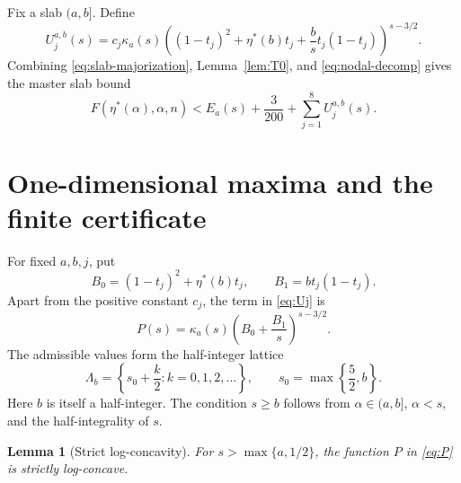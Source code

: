 \documentclass[11pt]{amsart}
\newtheorem{lemma}[theorem]{Lemma}
\theoremstyle{definition}
\newcommand{\etaStar}{\eta^{\ast}}
\begin{document}
Fix a slab $(a,b]$.  Define
\begin{equation}\label{eq:Uj}
 U_j^{a,b}(s)=
 c_j\kappa_a(s)
 \left((1-t_j)^2+\etaStar(b)t_j
 +\frac{b}{s}t_j(1-t_j)\right)^{s-3/2}.
\end{equation}
Combining \eqref{eq:slab-majorization}, Lemma~\ref{lem:T0}, and \eqref{eq:nodal-decomp} gives the master slab bound
\begin{equation}\label{eq:master-slab}
 F(\etaStar(\alpha),\alpha,n)
 <E_a(s)+\frac3{200}+\sum_{j=1}^{8}U_j^{a,b}(s).
\end{equation}

\section{One-dimensional maxima and the finite certificate}\label{sec:certificate}

For fixed $a,b,j$, put
\[
 B_0=(1-t_j)^2+\etaStar(b)t_j,
 \qquad
 B_1=bt_j(1-t_j).
\]
Apart from the positive constant $c_j$, the term in \eqref{eq:Uj} is
\begin{equation}\label{eq:P}
 P(s)=\kappa_a(s)\left(B_0+\frac{B_1}{s}\right)^{s-3/2}.
\end{equation}
The admissible values form the half-integer lattice
\begin{equation}\label{eq:lattice}
 \Lambda_b
 =\left\{s_0+\frac{k}{2}:k=0,1,2,\ldots\right\},
 \qquad
 s_0=\max\left\{\frac52,b\right\}.
\end{equation}
Here $b$ is itself a half-integer.  The condition $s\ge b$ follows from
$\alpha\in(a,b]$, $\alpha<s$, and the half-integrality of $s$.

\begin{lemma}[Strict log-concavity]\label{lem:logconcavity}
For $s>\max\{a,1/2\}$, the function $P$ in \eqref{eq:P} is strictly log-concave.
\end{lemma}
\end{document}
